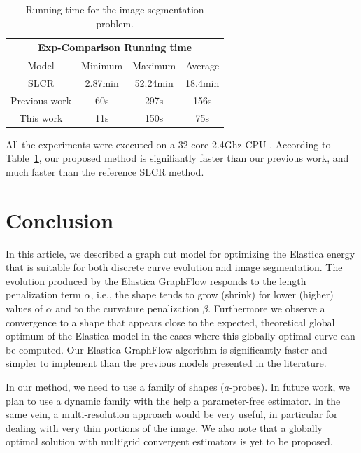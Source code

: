 \documentclass[runningheads]{llncs}
\newcommand{\daniel}[1]{ {\color{black}#1} }
\begin{document}
\begin{table}[t]
  \centering
 \caption{Running time for the image segmentation problem.}
\label{ch9:tab:rtime-image-segmentation-general} 
\captionsetup{type=table}
\begin{tabular}{|c|c|c|c|}
\hline
\multicolumn{4}{|c|}{Exp-Comparison Running time}\\
\hline
Model & Minimum & Maximum & Average \\
\hline
SLCR & 2.87min & 52.24min & 18.4min\\
Previous work & 60s & 297s & 156s\\
This work  & 11s & 150s & 75s\\
\hline
\end{tabular}
\end{table}

\daniel{All the experiments were executed on a 32-core 2.4Ghz CPU}. According to Table~\ref{ch9:tab:rtime-image-segmentation-general}, our proposed method is signifiantly faster than
our previous work, and much faster than the reference SLCR method.

\section{Conclusion}
In this article, we described a graph cut model for optimizing the
Elastica energy that is suitable for both discrete curve evolution and
image segmentation. The evolution produced by the Elastica GraphFlow
responds to the length penalization term $\alpha$, i.e., the shape
tends to grow (shrink) for lower (higher) values of $\alpha$ and to
the curvature penalization $\beta$. Furthermore we observe a
convergence to a shape that appears close to the expected, theoretical
global optimum of the Elastica model in the cases where this globally
optimal curve can be computed. Our Elastica GraphFlow algorithm is
significantly faster and simpler to implement than the previous models
presented in the literature.

In our method, we need to use a family of shapes ($a$-probes). In future work, we plan to use a dynamic family with the
help a parameter-free estimator. In the same vein, a multi-resolution approach would be very useful, in particular for
dealing with very thin portions of the image. We also note that a globally optimal solution with multigrid convergent
estimators is yet to be proposed. 



\end{document}
